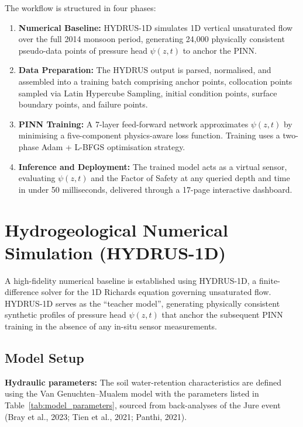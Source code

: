 \documentclass[12pt]{report}
\begin{document}
The workflow is structured in four phases:

\begin{enumerate}
    \item \textbf{Numerical Baseline:} HYDRUS-1D simulates 1D vertical
    unsaturated flow over the full 2014 monsoon period, generating
    24,000 physically consistent pseudo-data points of pressure head
    $\psi(z,t)$ to anchor the PINN.

    \item \textbf{Data Preparation:} The HYDRUS output is parsed,
    normalised, and assembled into a training batch comprising anchor
    points, collocation points sampled via Latin Hypercube Sampling,
    initial condition points, surface boundary points, and failure
    points.

    \item \textbf{PINN Training:} A 7-layer feed-forward network
    approximates $\psi(z,t)$ by minimising a five-component
    physics-aware loss function. Training uses a two-phase Adam
    + L-BFGS optimisation strategy.

    \item \textbf{Inference and Deployment:} The trained model acts
    as a virtual sensor, evaluating $\psi(z,t)$ and the Factor of
    Safety at any queried depth and time in under 50 milliseconds,
    delivered through a 17-page interactive dashboard.
\end{enumerate}

\section{Hydrogeological Numerical Simulation (HYDRUS-1D)}

A high-fidelity numerical baseline is established using HYDRUS-1D, a
finite-difference solver for the 1D Richards equation governing
unsaturated flow. HYDRUS-1D serves as the ``teacher model'', generating
physically consistent synthetic profiles of pressure head $\psi(z,t)$
that anchor the subsequent PINN training in the absence of any in-situ
sensor measurements.

\subsection{Model Setup}

\textbf{Hydraulic parameters:} The soil water-retention characteristics
are defined using the Van Genuchten--Mualem model with the parameters
listed in Table~\ref{tab:model_parameters}, sourced from back-analyses
of the Jure event (Bray et al., 2023; Tien et al., 2021; Panthi, 2021).
\end{document}
